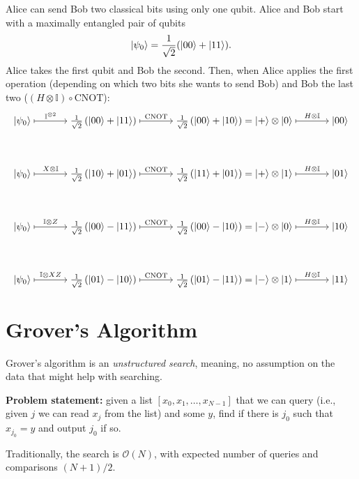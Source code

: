 \documentclass[12pt]{amsart}
\theoremstyle{plain}
\theoremstyle{definition}
\theoremstyle{remarks}
\newcommand{\mcal}{\mathcal}
\newcommand{\cnot}{\mathrm{CNOT}}  %
\newcommand{\idt}{\mathbb{I}}
\begin{document}
Alice can send Bob two classical bits using only one qubit.  Alice and Bob start with a maximally entangled pair of qubits
\[
  \ket{\psi_0} = \frac{1}{\sqrt2}(\ket{00} + \ket{11}).
\]
Alice takes the first qubit and Bob the second.  Then, when Alice applies the first operation (depending on which two bits she wants to send Bob) and Bob the last two ($(H \otimes \idt) \circ \cnot$):
\[
  \begin{tikzcd}[cramped, sep=8ex]
    \ket{\psi_0} \arrow[r, mapsto, "\idt^{\otimes 2}"] & \frac{1}{\sqrt{2}} \left( \ket{00} + \ket{11} \right) \arrow[r, mapsto, "\cnot"] &  \frac{1}{\sqrt{2}} \left( \ket{00} + \ket{10} \right) = \ket{+} \otimes \ket{0} \arrow[r, mapsto, "H \otimes \idt"] & \ket{00} \\
    \ket{\psi_0} \arrow[r, mapsto, "X \otimes \idt"] & \frac{1}{\sqrt{2}} \left( \ket{10} + \ket{01} \right) \arrow[r, mapsto, "\cnot"] &  \frac{1}{\sqrt{2}} \left( \ket{11} + \ket{01} \right) = \ket{+} \otimes \ket{1} \arrow[r, mapsto, "H \otimes \idt"]  & \ket{01}\\
    \ket{\psi_0} \arrow[r, mapsto, "\idt \otimes Z"] & \frac{1}{\sqrt{2}} \left( \ket{00} - \ket{11} \right) \arrow[r, mapsto, "\cnot"] &  \frac{1}{\sqrt{2}} \left( \ket{00} - \ket{10} \right) = \ket{-} \otimes \ket{0} \arrow[r, mapsto, "H \otimes \idt"]  & \ket{10}\\
    \ket{\psi_0} \arrow[r, mapsto, "\idt \otimes XZ"] & \frac{1}{\sqrt{2}} \left( \ket{01} - \ket{10} \right) \arrow[r, mapsto, "\cnot"] &  \frac{1}{\sqrt{2}} \left( \ket{01} - \ket{11} \right) = \ket{-} \otimes \ket{1} \arrow[r, mapsto, "H \otimes \idt"]  & \ket{11}
  \end{tikzcd}
\]




\section{Grover's Algorithm}

Grover's algorithm is an \emph{unstructured search}, meaning, no assumption on the data that might help with searching.


\textbf{Problem statement:} given a list $[x_0, x_1, \ldots , x_{N-1}]$ that we can query (i.e., given $j$ we can read $x_j$ from the list) and some $y$, find if there is $j_0$ such that $x_{j_0} = y$ and output $j_0$ if so.

Traditionally, the search is $\mcal{O}(N)$, with expected number of queries and comparisons $(N + 1)/2$.
\end{document}
